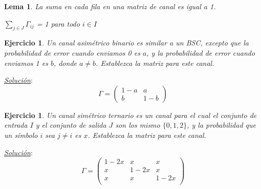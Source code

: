 \documentclass{beamer}
\theoremstyle{plain}
\newtheorem{lema} [theorem] {Lema}
\theoremstyle{example}
\newtheorem{ejercicio} [Ejercicio]{Ejercicio}
\theoremstyle{example}
\begin{document}
\begin{frame}  \small 

\begin{lema}

La suma en cada fila en una matriz de canal es igual a 1. 

\begin{center}
$\sum_{j \in J} \Gamma_{ij}$ = 1 para todo $i \in I$
\end{center}

\end{lema}

\end{frame} 

\begin{frame}  \small 

\begin{ejercicio} 

Un canal asimétrico binario es similar a un BSC, excepto que la probabilidad de error cuando enviamos 0 es $a$, y la probabilidad de error cuando enviamos 1 es $b$, donde $a \neq b$. Establezca la matriz para este canal.
\end{ejercicio} 



\textit{\underline{Solución}}:\\

\[
\Gamma =  \left( \begin{array}{cc}
           1-a       & a      \\
            b    & 1-b      
           \end{array}
    \right)    
\]

\end{frame} 
\begin{frame}  \small 

\begin{ejercicio} 

Un canal simétrico ternario es un  canal para el cual el conjunto de entrada $I$ y el conjunto de salida $J$ son los mismo $\{0,1,2\}$, y la probabilidad que un símbolo $i$ sea $j \neq i$ es $x$. Establezca la matriz para este canal.

\end{ejercicio} 


\textit{\underline{Solución}}:\\

\[
\Gamma =  \left( \begin{array}{ccc}
           1-2x       & x  & x    \\
            x       &  1-2x  & x    \\
           x       & x  & 1-2x    \\
           \end{array}
    \right)    
\]

\end{frame} 
\end{document}
